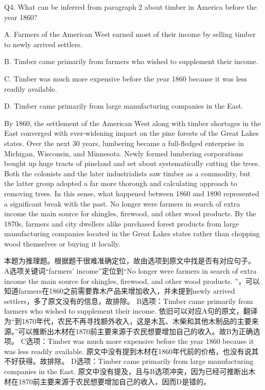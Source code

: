 \begin{blk}
    \begin{qst}
        Q4.
        What can be inferred from paragraph 2 about timber in America before the year 1860?
    \end{qst}

    \begin{chc}
        A.
        Farmers of the American West earned most of their income by selling timber to newly arrived settlers.

        B.
        Timber came primarily from farmers who wished to supplement their income.

        C.
        Timber was much more expensive before the year 1860 because it was less readily available.

        D.
        Timber came primarily from large manufacturing companies in the East.
    \end{chc}

    \begin{psgq}
        By 1860, the settlement of the American West along with timber shortages in the East converged with ever-widening impact on the pine forests of the Great Lakes states. Over the next 30 years, lumbering became a full-fledged enterprise in Michigan, Wisconsin, and Minnesota. Newly formed lumbering corporations bought up huge tracts of pineland and set about systematically cutting the trees. Both the colonists and the later industrialists saw timber as a commodity, but the latter group adopted a far more thorough and calculating approach to removing trees. In this sense, what happened between 1860 and 1890 represented a significant break with the past. No longer were farmers in search of extra income the main source for shingles, firewood, and other wood products. By the 1870s, farmers and city dwellers alike purchased forest products from large manufacturing companies located in the Great Lakes states rather than chopping wood themselves or buying it locally.
    \end{psgq}

    \begin{nlz}
        本题为推理题。根据题干很难准确定位，故由选项到原文中找是否有对应句子。 A选项关键词“farmers’ income”定位到“No longer were farmers in search of extra income the main source for shingles, firewood, and other wood products. ”，可以知道farmers在1860之前需要靠木产品来增加收入，并未提到newly arrived settlers，多了原文没有的信息，故排除。 B选项：Timber came primarily from farmers who wished to supplement their income. 依旧可以对应A句的原文，翻译为“到1870年代，农民不再寻找额外收入，这是木瓦、木柴和其他木制品的主要来源。”可以推断出木材在1870前主要来源于农民想要增加自己的收入。故B为正确选项。 C选项：Timber was much more expensive before the year 1860 because it was less readily available. 原文中没有提到木材在1860年代前的价格，也没有说其不好获得。故排除。 D选项：Timber came primarily from large manufacturing companies in the East. 原文中没有提及，且与B选项冲突，因为已经可推断出木材在1870前主要来源于农民想要增加自己的收入，因而D是错的。
    \end{nlz}
\end{blk}

